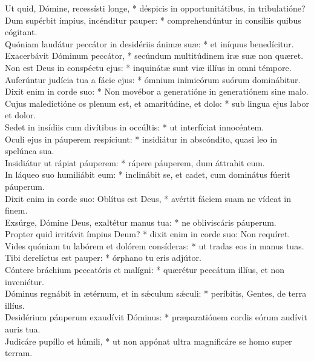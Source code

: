 {	Ut quid, Dómine, recessísti longe, * déspicis in opportunitátibus, in tribulatióne? \\
	Dum supérbit ímpius, incénditur pauper: * comprehendúntur in consíliis quibus cógitant. \\
	Quóniam laudátur peccátor in desidériis ánimæ suæ: * et iníquus benedícitur. \\
	Exacerbávit Dóminum peccátor, * secúndum multitúdinem iræ suæ non quæret. \\
	Non est Deus in conspéctu ejus: * inquinátæ sunt viæ illíus in omni témpore. \\
	Auferúntur judícia tua a fácie ejus: * ómnium inimicórum suórum dominábitur. \\
	Dixit enim in corde suo: * Non movébor a generatióne in generatiónem sine malo. \\
	Cujus maledictióne os plenum est, et amaritúdine, et dolo: * sub lingua ejus labor et dolor. \\
	Sedet in insídiis cum divítibus in occúltis: * ut interfíciat innocéntem. \\
	Oculi ejus in páuperem respíciunt: * insidiátur in abscóndito, quasi leo in spelúnca sua. \\
	Insidiátur ut rápiat páuperem: * rápere páuperem, dum áttrahit eum. \\
	In láqueo suo humiliábit eum: * inclinábit se, et cadet, cum dominátus fúerit páuperum. \\
	Dixit enim in corde suo: Oblítus est Deus, * avértit fáciem suam ne vídeat in finem. \\
	Exsúrge, Dómine Deus, exaltétur manus tua: * ne obliviscáris páuperum. \\
	Propter quid irritávit ímpius Deum? * dixit enim in corde suo: Non requíret. \\
	Vides quóniam tu labórem et dolórem consíderas: * ut tradas eos in manus tuas. \\
	Tibi derelíctus est pauper: * órphano tu eris adjútor. \\
	Cóntere bráchium peccatóris et malígni: * quærétur peccátum illíus, et non inveniétur. \\
	Dóminus regnábit in ætérnum, et in sǽculum sǽculi: * períbitis, Gentes, de terra illíus. \\
	Desidérium páuperum exaudívit Dóminus: * præparatiónem cordis eórum audívit auris tua. \\
	Judicáre pupíllo et húmili, * ut non appónat ultra magnificáre se homo super terram. \\
}

